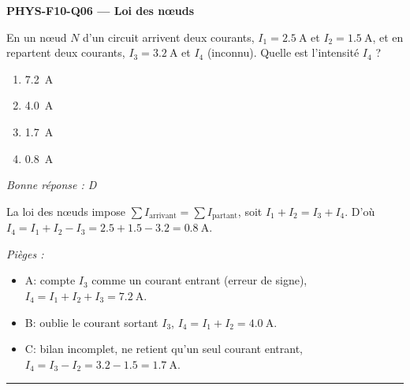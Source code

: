 \documentclass[11pt,a4paper]{article}
\begin{document}
\noindent\textbf{PHYS-F10-Q06 --- Loi des n\oe{}uds}\par
En un n\oe{}ud $N$ d'un circuit arrivent deux courants, $I_1 = \qty{2.5}{\ampere}$ et $I_2 = \qty{1.5}{\ampere}$, et en repartent deux courants, $I_3 = \qty{3.2}{\ampere}$ et $I_4$ (inconnu). Quelle est l'intensité $I_4$ ?
\begin{center}
\end{center}
\begin{enumerate}[label=\Alph*)]
\item \qty{7.2}{\ampere}
\item \qty{4.0}{\ampere}
\item \qty{1.7}{\ampere}
\item \qty{0.8}{\ampere}
\end{enumerate}
\textit{Bonne réponse : D}\par
La loi des n\oe{}uds impose $\sum I_{\text{arrivant}} = \sum I_{\text{partant}}$, soit $I_1 + I_2 = I_3 + I_4$. D'où $I_4 = I_1 + I_2 - I_3 = 2.5 + 1.5 - 3.2 = \qty{0.8}{\ampere}$.\par
\textit{Pièges :}
\begin{itemize}
\item A: compte $I_3$ comme un courant entrant (erreur de signe), $I_4 = I_1 + I_2 + I_3 = \qty{7.2}{\ampere}$.
\item B: oublie le courant sortant $I_3$, $I_4 = I_1 + I_2 = \qty{4.0}{\ampere}$.
\item C: bilan incomplet, ne retient qu'un seul courant entrant, $I_4 = I_3 - I_2 = 3.2 - 1.5 = \qty{1.7}{\ampere}$.
\end{itemize}
\vspace{8pt}\hrule\vspace{8pt}
\end{document}
